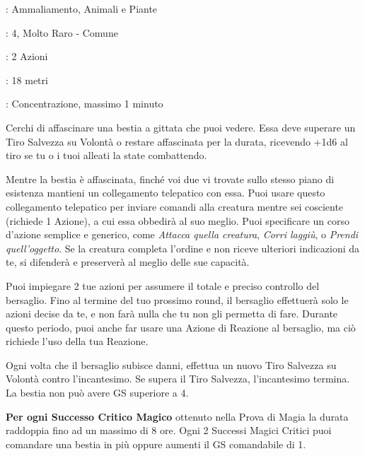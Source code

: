 \begin{multicols}{2}
\noindent\colorbox{OBSSgold!10}{
\begin{minipage}{0.95\linewidth}
\begin{description}[noitemsep, topsep=0pt, parsep=0pt, partopsep=0pt, leftmargin=0cm, labelwidth=1.3cm]
	\item[\textbf{Lista}]: Ammaliamento, Animali e Piante
	\item[\textbf{Livello}]: 4, Molto Raro - Comune
	\item[\textbf{Lancio}]: 2 Azioni
	\item[\textbf{Gittata}]: 18 metri
	\item[\textbf{Durata}]: Concentrazione, massimo 1 minuto
\end{description}
\end{minipage}}\smallskip

Cerchi di affascinare una bestia a gittata che puoi vedere. Essa deve superare un Tiro Salvezza su Volontà o restare affascinata per la durata, ricevendo +1d6 al tiro se tu o i tuoi alleati la state combattendo.

Mentre la bestia è affascinata, finché voi due vi trovate sullo stesso piano di esistenza mantieni un collegamento telepatico con essa. Puoi usare questo collegamento telepatico per inviare comandi alla creatura mentre sei cosciente (richiede 1 Azione), a cui essa obbedirà al suo meglio. Puoi specificare un corso d'azione semplice e generico, come \emph{Attacca quella creatura}, \emph{Corri laggiù}, o \emph{Prendi quell'oggetto}. Se la creatura completa l'ordine e non riceve ulteriori indicazioni da te, si difenderà e preserverà al meglio delle sue capacità.

Puoi impiegare 2 tue azioni per assumere il totale e preciso controllo del bersaglio. Fino al termine del tuo prossimo round, il bersaglio effettuerà solo le azioni decise da te, e non farà nulla che tu non gli permetta di fare. Durante questo periodo, puoi anche far usare una Azione di Reazione al bersaglio, ma ciò richiede l'uso della tua Reazione.

Ogni volta che il bersaglio subisce danni, effettua un nuovo Tiro Salvezza su Volontà contro l'incantesimo. Se supera il Tiro Salvezza, l'incantesimo termina. La bestia non può avere GS superiore a 4.

\textbf{Per ogni Successo Critico Magico} ottenuto nella Prova di Magia la durata raddoppia fino ad un massimo di 8 ore. Ogni 2 Successi Magici Critici puoi comandare una bestia in più oppure aumenti il GS comandabile di 1.


\end{multicols}
